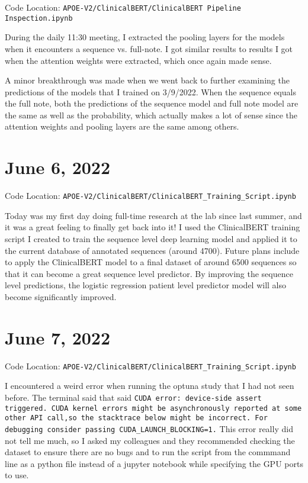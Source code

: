 \documentclass[11pt,letterpaper]{article}
\begin{document}
Code Location: \texttt{APOE-V2/ClinicalBERT/ClinicalBERT Pipeline Inspection.ipynb}

During the daily 11:30 meeting, I extracted the pooling layers for the models when it encounters a sequence vs. full-note. I got similar results to results I got when the attention weights were extracted, which once again made sense.

A minor breakthrough was made when we went back to further examining the predictions of the models that I trained on 3/9/2022. When the sequence equals the full note, both the predictions of the sequence model and full note model are the same as well as the probability, which actually makes a lot of sense since the attention weights and pooling layers are the same among others. 

\section{June 6, 2022}

Code Location: \texttt{APOE-V2/ClinicalBERT/ClinicalBERT\_Training\_Script.ipynb}

Today was my first day doing full-time research at the lab since last summer, and it was a great feeling to finally get back into it! I used the ClinicalBERT training script I created to train the sequence level deep learning model and applied it to the current database of annotated sequences (around 4700). Future plans include to apply the ClinicalBERT model to a final dataset of around 6500 sequences so that it can become a great sequence level predictor. By improving the sequence level predictions, the logistic regression patient level predictor model will also become significantly improved. 

\section{June 7, 2022}

Code Location: \texttt{APOE-V2/ClinicalBERT/ClinicalBERT\_Training\_Script.ipynb}

I encountered a weird error when running the optuna study that I had not seen before. The terminal said that said \texttt{CUDA error: device-side assert triggered. CUDA kernel errors might be asynchronously reported at some other API call,so the stacktrace below might be incorrect. For debugging consider passing CUDA\_LAUNCH\_BLOCKING=1.} This error really did not tell me much, so I asked my colleagues and they recommended checking the dataset to ensure there are no bugs and to run the script from the commmand line as a python file instead of a jupyter notebook while specifying the GPU ports to use.
\end{document}
